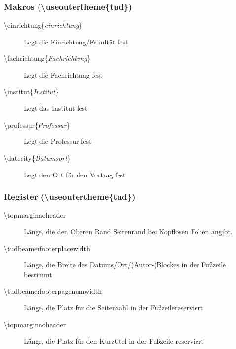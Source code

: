 \documentclass[presentation,t]{beamer}
\begin{document}
\subsubsection{Makros (\textbackslash useoutertheme\{tud\})}
\label{sec:org8a9f8a8}
\begin{description}
\item[{\textbackslash einrichtung\{\emph{einrichtung}\}}] Legt die
Einrichtung/Fakultät fest
\item[{\textbackslash fachrichtung\{\emph{Fachrichtung}\}}] Legt die
Fachrichtung fest
\item[{\textbackslash institut\{\emph{Institut}\}}] Legt das
Institut fest
\item[{\textbackslash professur\{\emph{Professur}\}}] Legt die
Professur fest
\item[{\textbackslash datecity\{\emph{Datumsort}\}}] Legt den Ort für den Vortrag fest
\end{description}
\subsubsection{Register (\textbackslash useoutertheme\{tud\})}
\label{sec:orgf0196b1}
\begin{description}
\item[{\textbackslash topmarginnoheader}] Länge, die den Oberen Rand Seitenrand bei
Kopflosen Folien angibt.
\item[{\textbackslash tudbeamerfooterplacewidth}] Länge, die Breite des
Datums/Ort/(Autor-)Blockes in der Fußzeile bestimmt
\item[{\textbackslash tudbeamerfooterpagenumwidth}] Länge, die Platz für
die Seitenzahl in der Fußzeilereserviert
\item[{\textbackslash topmarginnoheader}] Länge, die Platz für den
Kurztitel in der Fußzeile reserviert
\end{description}
\end{document}

